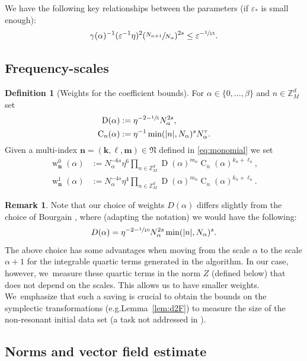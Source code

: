 \documentclass[10pt,a4paper]{amsart}
\providecommand{\eg}{e.g.}
\DeclareMathOperator{\rw}{w}
\theoremstyle{plain}
\theoremstyle{definition}
\newtheorem{definition}[theorem]{Definition}
\newtheorem{remark}[theorem]{Remark}
\newcommand{\nb}{{\boldsymbol n}}
\newcommand{\kb}{{\boldsymbol k}}
\newcommand{\lb}{{\boldsymbol \ell}}
\newcommand{\mb}{{\boldsymbol m}}
\newcommand{\Nb}{{\boldsymbol{\mathfrak{N}}}}
\newcommand{\Z}{\mathbb{Z}}
\newcommand{\1}{\mathbf{1}}
\let\epsilon\varepsilon
\providecommand{\Subsection}{\subsection}
\begin{document}
We have the following key relationships between the parameters (if $\epsilon_{\ast}$ is small enough):
\begin{align}
\label{eq:par}
\gamma(\alpha)^{-1}(\epsilon^{-1}\eta)^{2}(\sfrac{N_{\alpha+1}}{N_{\alpha}})^{2s}
\leq \epsilon^{-\sfrac{1}{15}}.
\end{align}

\Subsection{Frequency-scales}

\begin{definition}[Weights for the coefficient bounds]
\label{def:weight}
For $\alpha\in\{0,\dots,\beta\}$ and $n\in\Z_{M}^{d}$ set
\begin{align*}
\operatorname{D}(\alpha) &:= \eta^{-2-\sfrac{1}{5}}N_\alpha^{2s},\\
\operatorname{C}_{n}(\alpha) &:= \eta^{-1}\min(|n|, N_\alpha)^{s}N_{\alpha}^\tau.
\end{align*}
Given a multi-index $\nb=(\kb,\lb,\mb)\in\Nb$ defined in \eqref{eq:monomial} we set
\begin{align*}
\rw_{\nb}^{0}(\alpha) &:= N_\alpha^{-6s}\eta^{6}\prod_{n\in\Z_{M}^{d}}\operatorname{D}(\alpha)^{m_n}\operatorname{C}_{n}(\alpha)^{k_n+\ell_n},\\
\tag*{and}
\rw^1_{\nb}(\alpha) &:= N_\alpha^{-4s}\eta^4\prod_{n\in\Z_{M}^{d}}\operatorname{D}(\alpha)^{m_n}\operatorname{C}_{n}(\alpha)^{k_n+\ell_n}.
\end{align*}
\end{definition}
\begin{remark} \label{rq:comp_bou}
Note that our choice of weights $D(\alpha)$ differs slightly from the choice of Bourgain \cite{Bou00}, where (adapting the notation) we would have the following:
\[
D(\alpha) = \eta^{-2-\sfrac{1}{10}}N_{\alpha}^{2s}\min(|n|, N_{\alpha})^{s}.
\]
The above choice has some advantages when moving from the scale $\alpha$ to the scale $\alpha+1$ for the integrable quartic terms generated in the algorithm. In our case, however, we~measure these quartic terms in the norm $Z$ (defined below) that does not depend on the scales. This allows us to have smaller weights. We~emphasize that such a saving is crucial to obtain the bounds on the symplectic transformations (\eg Lemma~\ref{lem:d2F}) to measure the size of the non-resonant initial data set (a task not addressed in \cite{Bou00}).
\end{remark}

\subsection{Norms and vector field estimate}
\end{document}
